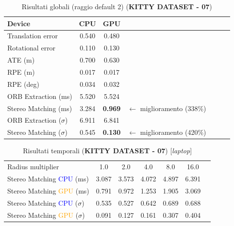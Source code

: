 \documentclass[12pt,a4paper]{report}
\begin{document}
\begin{table}[H]
    \centering
    \caption{Risultati globali (raggio default 2) (\textbf{KITTY DATASET - 07}) }
    \begin{tabular}{lcccccc}
        \toprule
        \rowcolor{gray!20}
        Device & \cellcolor{blue!20}CPU & \cellcolor{orange!20}GPU  \\
        \midrule
        Translation error & 0.540 & \cellcolor{green!20}0.480  \\
        Rotational error  & \cellcolor{green!20}0.110 & 0.130  \\
        ATE (m)           & 0.700 & \cellcolor{green!20}0.630  \\
        RPE (m)           & \cellcolor{green!20}0.017 & \cellcolor{green!20}0.017  \\
        RPE (deg)         & 0.034 & \cellcolor{green!20}0.032  \\
        ORB Extraction (ms) & \cellcolor{green!20}5.520 & 5.524 &&  \\
        Stereo Matching (ms) & 3.284 & \cellcolor{green!20}\textbf{0.969}  & $\xleftarrow{}$ miglioramento (338\%)\\
        ORB Extraction ($\sigma$) & 6.911 & \cellcolor{green!20}6.841  \\
        Stereo Matching ($\sigma$) & 0.545 & \cellcolor{green!20}\textbf{0.130} & $\xleftarrow{}$ miglioramento (420\%) \\
        \bottomrule
    \end{tabular}
\end{table}

\begin{table}[H]
    \centering
    \caption{Risultati temporali (\textbf{KITTY DATASET - 07}) [\textit{laptop}] }
    \begin{tabular}{lcccccc}
        \toprule
        \rowcolor{gray!20}
        Radius multiplier & 1.0 & \cellcolor{orange!40}2.0 & 4.0 & 8.0 & 16.0 \\
        Stereo Matching \textcolor{blue}{CPU} (ms) & 3.087 & 3.573 & 4.072 & 4.897 & 6.391 \\
        Stereo Matching \textcolor{orange}{GPU} (ms) & 0.791 & 0.972 & 1.253 & 1.905 & 3.069 \\
        Stereo Matching \textcolor{blue}{CPU} ($\sigma$) & 0.535 & 0.527 & 0.642 & 0.689 & 0.688\\
        Stereo Matching \textcolor{orange}{GPU} ($\sigma$) & 0.091 & 0.127 & 0.161 & 0.307 & 0.404 \\
        \bottomrule
    \end{tabular}
\end{table}
\end{document}
